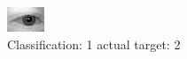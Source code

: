 \begin{figure}[h!]
\begin{center}
\includegraphics[width=0.60\columnwidth]{figures/ID385_class_1_target_2.png}
\end{center}
\caption{ Classification: 1 actual target: 2}
\label{fig:ID385_class_1_target_2}
\end{figure}
